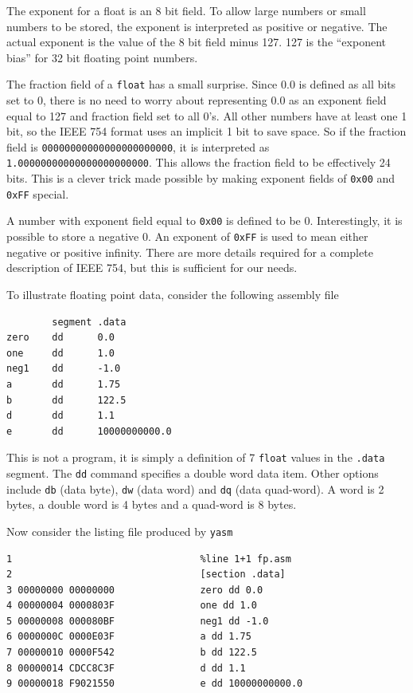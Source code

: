 \documentclass[11pt,b5paper]{book}
\begin{document}
The exponent for a float is an 8 bit field.
To allow large numbers or small numbers to be stored, the exponent is
interpreted as positive or negative.
The actual exponent is the value of the 8 bit field minus 127.
127 is the ``exponent bias'' for 32 bit floating point numbers.

The fraction field of a {\tt float} has a small surprise.
Since 0.0 is defined as all bits set to 0, there is no need to worry about
representing 0.0 as an exponent field equal to 127 and fraction field set to
all 0's.
All other numbers have at least one 1 bit, so
the IEEE 754 format uses an implicit 1 bit to save space.
So if the fraction field is {\tt 00000000000000000000000}, it is interpreted
as {\tt 1.00000000000000000000000}. 
This allows the fraction field to be effectively 24 bits.
This is a clever trick made possible by making exponent fields of {\tt 0x00}
and {\tt 0xFF} special.

A number with exponent field equal to {\tt 0x00} is defined to be 0.
Interestingly, it is possible to store a negative 0.
An exponent of {\tt 0xFF} is used to mean either negative or positive
infinity.
There are more details required for a complete description of IEEE 754,
but this is sufficient for our needs.

To illustrate floating point data, consider the following assembly file 
\begin{verbatim}
        segment .data
zero    dd      0.0
one     dd      1.0
neg1    dd      -1.0
a       dd      1.75
b       dd      122.5
d       dd      1.1
e       dd      10000000000.0
\end{verbatim}
This is not a program, it is simply a definition of 7 {\tt float} values
in the {\tt .data} segment.
The {\tt dd} command specifies a double word data item.
Other options include {\tt db} (data byte), {\tt dw} (data word) and
{\tt dq} (data quad-word).
A word is 2 bytes, a double word is 4 bytes and a quad-word is 8 bytes.

Now consider the listing file produced by {\tt yasm}
\begin{verbatim}
1                                 %line 1+1 fp.asm
2                                 [section .data]
3 00000000 00000000               zero dd 0.0
4 00000004 0000803F               one dd 1.0
5 00000008 000080BF               neg1 dd -1.0
6 0000000C 0000E03F               a dd 1.75
7 00000010 0000F542               b dd 122.5
8 00000014 CDCC8C3F               d dd 1.1
9 00000018 F9021550               e dd 10000000000.0
\end{verbatim}
\end{document}
